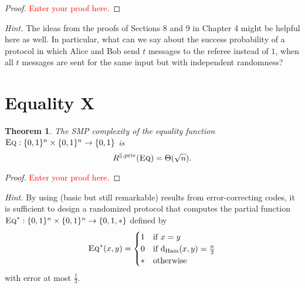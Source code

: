 \documentclass[11pt]{amsart}
\theoremstyle{plain}
\newtheorem{theorem}{Theorem}
\theoremstyle{definition}
\theoremstyle{plain}
\newcommand{\dHam}{\mathrm{d}_{\mathrm{Ham}}}
\newcommand{\Eq}{\textsc{Eq}}
\newcommand{\replacethistext}[1]{\textcolor{red}{#1}}
\begin{document}
\begin{proof}
\replacethistext{Enter your proof here.}
\end{proof}


\bigskip
\noindent \emph{Hint.} The ideas from the proofs of Sections 8 and 9 in Chapter 4 might be helpful here as well. In particular, what can we say about the success probability of a protocol in which Alice and Bob send $t$ messages to the referee instead of $1$, when all $t$ messages are sent for the same input but with independent randomness?


\newpage 
\section{Equality X}

\begin{theorem}
The SMP complexity of the equality function $\Eq : \{0,1\}^n \times \{0,1\}^n \to \{0,1\}$ is
\[
R^{\parallel,\mathrm{priv}}(\Eq) = \Theta(\sqrt{n}).
\]
\end{theorem}

\begin{proof}
\replacethistext{Enter your proof here.}
\end{proof}

\bigskip
\noindent \emph{Hint.} By using (basic but still remarkable) results from error-correcting codes, it is sufficient to design a randomized protocol that computes the partial function $\Eq^* : \{0,1\}^n \times \{0,1\}^n \to \{0,1,*\}$ defined by
\[
\Eq^*(x,y) = \begin{cases}
1 & \mbox{if } x = y \\
0 & \mbox{if } \dHam(x,y) = \frac n2 \\
* & \mbox{otherwise}
\end{cases}
\]
with error at most $\frac13$.
\end{document}
